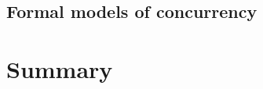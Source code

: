 \subsection{Formal models of concurrency}\label{formalmodels}


%



\section{Summary}\label{sumArt}

